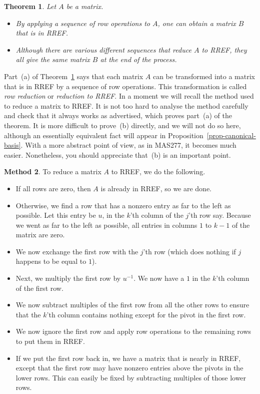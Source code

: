\documentclass[reqno]{amsart}
\newtheorem{theorem}{Theorem}[section]
\theoremstyle{definition}
\newtheorem{method}[theorem]{Method}
\begin{document}
\begin{theorem}\label{thm-RREF}
 Let $A$ be a matrix.
 \begin{itemize}
  \item[(a)] By applying a sequence of row operations to $A$, one can
   obtain a matrix $B$ that is in RREF.
  \item[(b)] Although there are various different sequences that
   reduce $A$ to RREF, they all give the same matrix $B$ at the end of
   the process.
 \end{itemize}
\end{theorem}

Part~(a) of Theorem~\ref{thm-RREF} says that each matrix $A$ can be
transformed into a matrix that is in RREF by a sequence of row
operations.  This transformation is called
\emph{row reduction}
or \emph{reduction to RREF}.
In a moment we will recall the method used to reduce a matrix to RREF.
It is not too hard to analyse the method carefully and check that it
always works as advertised, which proves part~(a) of the theorem.  It
is more difficult to prove~(b) directly, and we will not do so here,
although an essentially equivalent fact will appear in
Proposition~\ref{prop-canonical-basis}.  With a more abstract point of
view, as in MAS277, it becomes much easier.  Nonetheless, you should
appreciate that~(b) is an important point.

\begin{method}\label{meth-RREF}
 To reduce a matrix $A$ to RREF, we do the following.
 \begin{itemize}
  \item[(a)] If all rows are zero, then $A$ is already in RREF, so we
   are done.
  \item[(b)] Otherwise, we find a row that has a nonzero entry as far
   to the left as possible.  Let this entry be $u$, in the $k$'th
   column of the $j$'th row say.  Because we went as far to the left
   as possible, all entries in columns $1$ to $k-1$ of the matrix are
   zero.
  \item[(c)] We now exchange the first row with the $j$'th row (which
   does nothing if $j$ happens to be equal to $1$).
  \item[(d)] Next, we multiply the first row by $u^{-1}$.  We now have
   a $1$ in the $k$'th column of the first row.
  \item[(e)] We now subtract multiples of the first row from all the
   other rows to ensure that the $k$'th column contains nothing except
   for the pivot in the first row.
  \item[(f)] We now ignore the first row and apply row operations to
   the remaining rows to put them in RREF.
  \item[(g)] If we put the first row back in, we have a matrix that is
   nearly in RREF, except that the first row may have nonzero entries
   above the pivots in the lower rows.  This can easily be fixed by
   subtracting multiples of those lower rows.
 \end{itemize}
\end{method}
\end{document}
